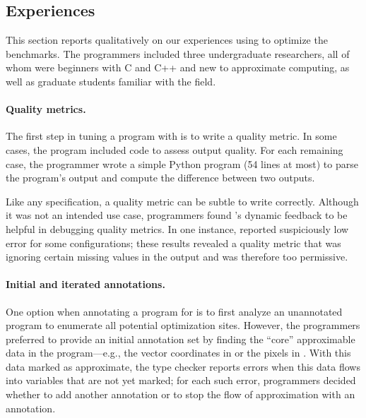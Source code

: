 

\subsection{Experiences}
\label{accept:sec:casestudy}

This section
reports qualitatively on our experiences using \sysname to optimize the benchmarks.
The programmers included three undergraduate researchers, all of whom were
beginners with C and C++ and new to approximate computing,
as well as graduate students familiar with the field.


\paragraph{Quality metrics.}
The first step in tuning a program with \sysname is to write a quality metric.
In some cases, the program included code to assess output quality.
For each remaining
case, the programmer wrote a simple Python program (54 lines at most) to parse the
program's output and compute the difference between two outputs.

Like any specification, a quality metric can be subtle to write correctly.
Although it was not an intended use case, programmers found \sysname's dynamic feedback to be helpful in debugging quality metrics.
In one instance, \sysname reported suspiciously low error for some
configurations; these results revealed a quality metric that was ignoring
certain missing values in the output and was therefore too permissive.


\paragraph{Initial and iterated annotations.}
One option when annotating a program for \sysname is to first analyze an
unannotated program to enumerate all potential optimization sites.
However, the programmers preferred
to
provide an initial annotation set by finding the ``core''
approximable data in the program---e.g., the vector coordinates in
 or the pixels in . With this data marked as
approximate, the type
checker reports errors when this data flows into variables that are not yet
marked; for each such error, programmers decided whether to add another 
annotation or to stop the flow of approximation with an 
annotation.

